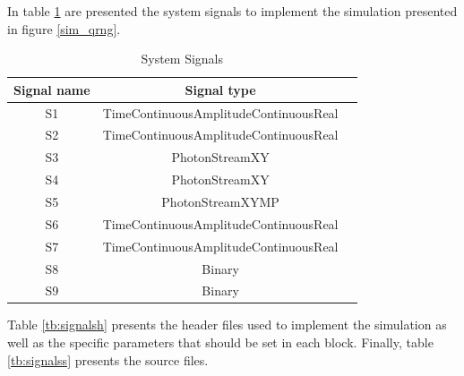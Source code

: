 In table \ref{tb:signals2} are presented the system signals to implement the simulation presented in figure \ref{sim_qrng}.
\begin{table}[H]
\centering
\caption{System Signals}
\label{tb:signals2}
\begin{tabular}{|c|c|c|}
\hline
\textbf{Signal name}                            & \textbf{Signal type}                      \\ \hline
S1                                              &  TimeContinuousAmplitudeContinuousReal    \\ \hline
S2                                              &  TimeContinuousAmplitudeContinuousReal    \\ \hline
S3                                              &  PhotonStreamXY                           \\ \hline
S4                                              &  PhotonStreamXY                           \\ \hline
S5                                              &  PhotonStreamXYMP                         \\ \hline
S6                                              &  TimeContinuousAmplitudeContinuousReal    \\ \hline
S7                                              &  TimeContinuousAmplitudeContinuousReal    \\ \hline
S8                                              &  Binary                                   \\ \hline
S9                                              &  Binary                                   \\ \hline
\end{tabular}
\end{table}

Table \ref{tb:signalsh} presents the header files used to implement the simulation as well as the specific parameters that should be set in each block. Finally, table \ref{tb:signalss} presents the source files.

